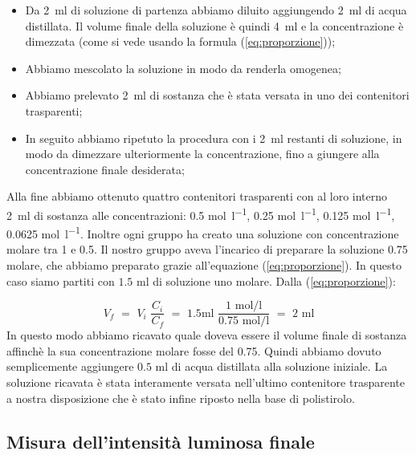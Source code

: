 \begin{itemize} \itemsep2pt \parskip0pt
	\item{Da \SI{2}{\milli\litre} di soluzione di partenza abbiamo diluito aggiungendo \SI{2}{\milli\litre} di acqua distillata.
	    Il volume finale della soluzione è quindi \SI{4}{\milli\litre} e la concentrazione è dimezzata (come si vede usando la formula
	    (\ref{eq:proporzione}));}
	\item{Abbiamo mescolato la soluzione in modo da renderla omogenea;}
	\item{Abbiamo prelevato \SI{2}{\milli\litre} di sostanza che è stata versata in uno dei contenitori trasparenti;}
	\item{In seguito abbiamo ripetuto la procedura con i \SI{2}{\milli\litre} restanti di soluzione, in modo da dimezzare ulteriormente la concentrazione, fino a giungere alla concentrazione finale desiderata;}
\end{itemize}

Alla fine abbiamo ottenuto quattro contenitori trasparenti con al loro interno \SI{2}{\milli\litre} di sostanza alle concentrazioni:
0.5 \si{\mol\per\litre}, 0.25 \si{\mol\per\litre}, 0.125 \si{\mol\per\litre}, 0.0625 \si{\mol\per\litre}.
Inoltre ogni gruppo ha creato una soluzione con concentrazione molare tra 1 e 0.5.
Il nostro gruppo aveva l'incarico di preparare la soluzione 0.75 molare, che abbiamo preparato
grazie all'equazione (\ref{eq:proporzione}). In questo caso siamo partiti con
$1.5\,\,\si{\milli\litre}$ di soluzione uno molare. Dalla (\ref{eq:proporzione}):

\begin{equation*}
	V_f \,\, = \,\, V_i \,\, \frac{C_i}{C_f} \,\, = \,\, 1.5 \si{\milli\litre} \,\, \frac{1 \,\, \si{\mole\per\litre}}{0.75 \,\, \si{\mole\per\litre}} \,\, = \,\, 2 \,\, \si{\milli\litre}
\end{equation*}
%
In questo modo abbiamo ricavato quale doveva essere il volume finale di sostanza affinchè la sua concentrazione molare fosse del 0.75. Quindi abbiamo dovuto semplicemente aggiungere $0.5\,\,\si{\milli\litre}$ di acqua distillata alla soluzione iniziale.
La soluzione ricavata è stata interamente versata nell'ultimo contenitore trasparente a nostra disposizione che è stato infine riposto nella base di polistirolo.

\subsection{Misura dell'intensità luminosa finale}


